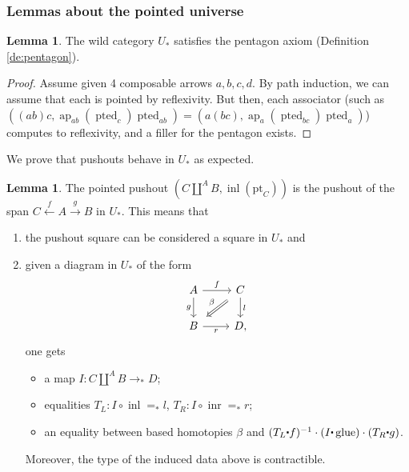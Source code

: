 \documentclass{amsart}
\theoremstyle{definition}
\newtheorem{lem}[theorem]{Lemma}
\newcommand{\ap}{\operatorname{ap}}
\newcommand{\inl}{\operatorname{inl}}
\newcommand{\inr}{\operatorname{inr}}
\newcommand{\glue}{\operatorname{glue}}
\newcommand{\bs}[1]{\mathrm{pt}_{#1}}
\newcommand{\ptd}[1]{\operatorname{pted}_{#1}}
\newcommand{\pto}{\to_*}
\newcommand{\whisk}{\raisebox{0.5ex}{$\displaystyle\centerdot$}}
\begin{document}
\subsubsection{Lemmas about the pointed universe}

\begin{lem}
    The wild category $U_*$ satisfies the pentagon axiom (Definition \ref{de:pentagon}).
\end{lem}
\begin{proof}
    Assume given 4 composable arrows $a, b, c, d$. By path induction, we can assume that each is pointed by reflexivity. But then, each associator (such as $((ab)c, \ap_{ab}(\ptd{c})\ptd{ab})  =(a(bc), \ap_a(\ptd{bc}) \ptd{a})$) computes to reflexivity, and a filler for the pentagon exists.
\end{proof}


We prove that pushouts behave in $U_*$ as expected.
\begin{lem}\label{pushout-proof}
    The pointed pushout $(C \coprod^A B, \inl(\bs{C}))$ is the pushout of the span $C \xleftarrow{f} A \xrightarrow{g} B$ in $U_*$. This means that
    \begin{enumerate}
    \item the pushout square can be considered a square in $U_*$ and
    \item given a diagram in $U_*$ of the form
    \[\begin{tikzcd}
    	A & C \\
    	B & {D,}
    	\arrow["f", from=1-1, to=1-2]
    	\arrow["g"', from=1-1, to=2-1]
    	\arrow["\beta"', shorten <=4pt, shorten >=4pt, Rightarrow, from=1-2, to=2-1]
    	\arrow["l", from=1-2, to=2-2]
    	\arrow["r"', from=2-1, to=2-2]
    \end{tikzcd}\]
    one gets
    \begin{itemize}
        \item
        a map $I: C \coprod^A B \pto D$;
        \item
        equalities $T_L: I \circ \inl =_* l$, $T_R: I \circ \inr =_* r$;
        \item
        an equality between based homotopies $\beta$ and $(T_L \whisk f)^{-1} \cdot (I \whisk \glue) \cdot (T_R \whisk g)$.
    \end{itemize}
    Moreover, the type of the induced data above is contractible.
    \end{enumerate}
\end{lem}
\end{document}
